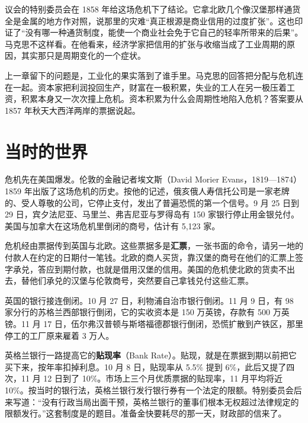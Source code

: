 议会的特别委员会在 1858 年给这场危机下了结论。它拿北欧几个像汉堡那样通货全是金属的地方作对照，说那里的灾难“真正根源是商业信用的过度扩张”。这也印证了“没有哪一种通货制度，能使一个商业社会免于它自己的轻率所带来的后果”\cite{evans1859}。马克思不这样看。在他看来，经济学家把信用的扩张与收缩当成了工业周期的原因，其实那只是周期变化的一个症状\cite{marx1887}。

上一章留下的问题是，工业化的果实落到了谁手里。马克思的回答把分配与危机连在一起。资本家把利润投回生产，财富在一极积累，失业的工人在另一极压着工资，积累本身又一次次撞上危机。资本积累为什么会周期性地陷入危机？答案要从 1857 年秋天大西洋两岸的票据说起。

\section{当时的世界}\label{sec:marx-world}

危机先在美国爆发。伦敦的金融记者埃文斯（David Morier Evans，1819—1874）1859 年出版了这场危机的历史\cite{evans1859,vian1889}。按他的记述，俄亥俄人寿信托公司是一家老牌的、受人尊敬的公司，它停止支付，发出了普遍恐慌的第一个信号\cite{evans1859}。9 月 25 日到 29 日，宾夕法尼亚、马里兰、弗吉尼亚与罗得岛有 150 家银行停止用金银兑付。美国与加拿大在这场危机里倒闭的商号，估计有 5,123 家\cite{evans1859}。

危机经由票据传到英国与北欧。这些票据多是\textbf{汇票}，一张书面的命令，请另一地的付款人在约定的日期付一笔钱。北欧的商人买货，靠汉堡的商号在他们的汇票上签字承兑，答应到期付款，也就是借用汉堡的信用\cite{evans1859}。美国的危机使北欧的货卖不出去，替他们承兑的汉堡与伦敦商号，突然要自己拿钱兑付这些汇票\cite{evans1859}。

英国的银行接连倒闭。10 月 27 日，利物浦自治市银行倒闭。11 月 9 日，有 98 家分行的苏格兰西部银行倒闭，它的实收资本是 150 万英镑，存款有 500 万英镑。11 月 17 日，伍尔弗汉普顿与斯塔福德郡银行倒闭，恐慌扩散到产铁区，那里停工的工厂原来雇着 3 万人\cite{evans1859}。

英格兰银行一路提高它的\textbf{贴现率}（Bank Rate）。贴现，就是在票据到期以前把它买下来，按年率扣掉利息。10 月 8 日，贴现率从 5.5\% 提到 6\%，此后又提了四次，11 月 12 日到了 10\%\cite{boe2017}。市场上三个月优质票据的贴现率，11 月平均将近 10\%\cite{boe2017}。按当时的银行法，英格兰银行发行银行券有一个法定的限额。特别委员会后来写道：“没有行政当局出面干预，英格兰银行的董事们根本无权超过法律规定的限额发行。”\cite{evans1859}这套制度是的题目。准备金快要耗尽的那一天，财政部的信来了。

